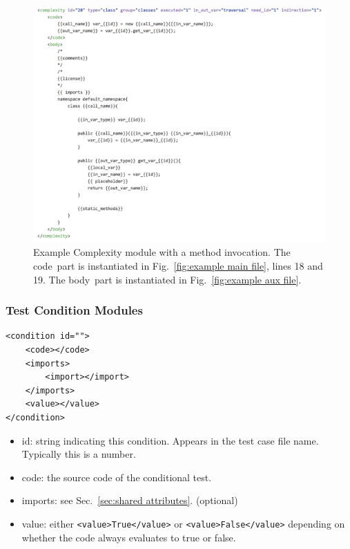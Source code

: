 \begin{figure}[tbph]
  \includegraphics[width=\linewidth]{fig_Complexity_file_method.png}
  \caption{Example Complexity module with a method invocation.
  The \texlangle code\texrangle\  part is instantiated in
  Fig.~\ref{fig:example main file}, lines 18 and 19.
  The \texlangle body\texrangle\  part is instantiated in
  Fig.~\ref{fig:example aux file}.}
  \label{fig:example complexity-method file}
\end{figure}

\subsubsection{Test Condition Modules}
\label{sec: condition modules}

\begin{verbatim}
<condition id="">
    <code></code>
    <imports>
        <import></import>
    </imports>
    <value></value>
</condition>
\end{verbatim}

\begin{itemize}
    \item id: string indicating this condition.  Appears in the test case
      file name.  Typically this is a number.

    \item code: the source code of the conditional test.

    \item imports: see Sec.~\ref{sec:shared attributes}. (optional)

    \item value: either \verb|<value>True</value>| or
        \verb|<value>False</value>| depending on \\
        whether the code always evaluates to true or false.
\end{itemize}


